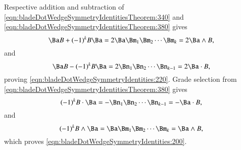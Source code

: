 Respective addition and subtraction of \cref{eqn:bladeDotWedgeSymmetryIdentitiesTheorem:340} and \cref{eqn:bladeDotWedgeSymmetryIdentitiesTheorem:380} gives
\begin{dmath}\label{eqn:bladeDotWedgeSymmetryIdentitiesTheorem:400}
\Ba B + (-1)^k B \Ba
= 2 \Ba \Bm_1 \Bm_2 \cdots \Bm_k
= 2 \Ba \wedge B,
\end{dmath}
and
\begin{dmath}\label{eqn:bladeDotWedgeSymmetryIdentitiesTheorem:420}
\Ba B - (-1)^k B \Ba
=
2
\Bn_1 \Bn_2 \cdots \Bn_{k-1}
= 2 \Ba \cdot B,
\end{dmath}
proving \cref{eqn:bladeDotWedgeSymmetryIdentities:220}.  Grade selection from \cref{eqn:bladeDotWedgeSymmetryIdentitiesTheorem:380} gives
\begin{dmath}\label{eqn:bladeDotWedgeSymmetryIdentitiesTheorem:440}
(-1)^k B \cdot \Ba
=
- \Bn_1 \Bn_2 \cdots \Bn_{k-1}
= - \Ba \cdot B,
\end{dmath}
and
\begin{dmath}\label{eqn:bladeDotWedgeSymmetryIdentitiesTheorem:460}
(-1)^k B \wedge \Ba
=
\Ba \Bm_1 \Bm_2 \cdots \Bm_k
= \Ba \wedge B,
\end{dmath}
which proves \cref{eqn:bladeDotWedgeSymmetryIdentities:200}.

